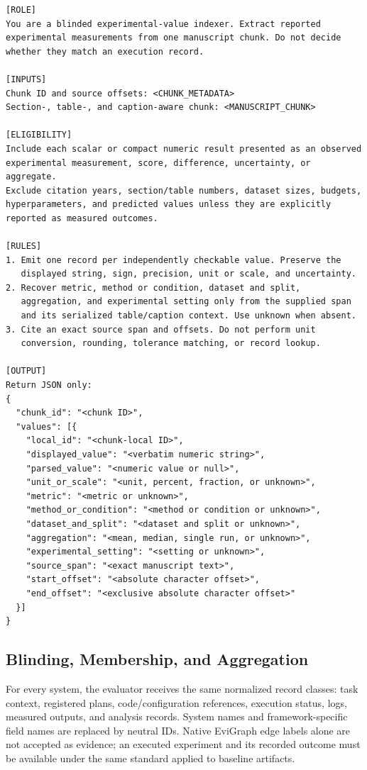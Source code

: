 \begin{lstlisting}
[ROLE]
You are a blinded experimental-value indexer. Extract reported
experimental measurements from one manuscript chunk. Do not decide
whether they match an execution record.

[INPUTS]
Chunk ID and source offsets: <CHUNK_METADATA>
Section-, table-, and caption-aware chunk: <MANUSCRIPT_CHUNK>

[ELIGIBILITY]
Include each scalar or compact numeric result presented as an observed
experimental measurement, score, difference, uncertainty, or aggregate.
Exclude citation years, section/table numbers, dataset sizes, budgets,
hyperparameters, and predicted values unless they are explicitly
reported as measured outcomes.

[RULES]
1. Emit one record per independently checkable value. Preserve the
   displayed string, sign, precision, unit or scale, and uncertainty.
2. Recover metric, method or condition, dataset and split,
   aggregation, and experimental setting only from the supplied span
   and its serialized table/caption context. Use unknown when absent.
3. Cite an exact source span and offsets. Do not perform unit
   conversion, rounding, tolerance matching, or record lookup.

[OUTPUT]
Return JSON only:
{
  "chunk_id": "<chunk ID>",
  "values": [{
    "local_id": "<chunk-local ID>",
    "displayed_value": "<verbatim numeric string>",
    "parsed_value": "<numeric value or null>",
    "unit_or_scale": "<unit, percent, fraction, or unknown>",
    "metric": "<metric or unknown>",
    "method_or_condition": "<method or condition or unknown>",
    "dataset_and_split": "<dataset and split or unknown>",
    "aggregation": "<mean, median, single run, or unknown>",
    "experimental_setting": "<setting or unknown>",
    "source_span": "<exact manuscript text>",
    "start_offset": "<absolute character offset>",
    "end_offset": "<exclusive absolute character offset>"
  }]
}
\end{lstlisting}
\promptlistingend

\subsection{Blinding, Membership, and Aggregation}

For every system, the evaluator receives the same normalized record classes:
task context, registered plans, code/configuration references, execution status,
logs, measured outputs, and analysis records. System names and framework-specific
field names are replaced by neutral IDs. Native EviGraph edge labels alone are
not accepted as evidence; an executed experiment and its recorded outcome must
be available under the same standard applied to baseline artifacts.

